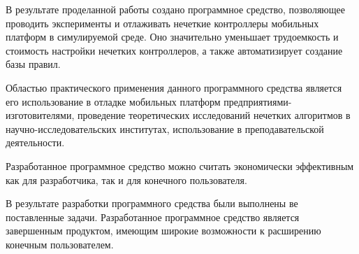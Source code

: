 %

В результате проделанной работы создано программное средство, позволяющее проводить эксперименты и отлаживать нечеткие контроллеры мобильных платформ в симулируемой среде. Оно значительно уменьшает трудоемкость и стоимость настройки нечетких контроллеров, а также автоматизирует создание базы правил.

Областью практического применения данного программного средства является его использование в отладке мобильных платформ предприятиями-изготовителями, проведение теоретических исследований нечетких алгоритмов в научно-исследовательских институтах, использование в преподавательской деятельности.

Разработанное программное средство можно считать экономически эффективным как для разработчика, так и для конечного пользователя.

В результате разработки программного средства были выполнены ве поставленные задачи. Разработанное программное средство является завершенным продуктом, имеющим широкие возможности к расширению конечным пользователем.